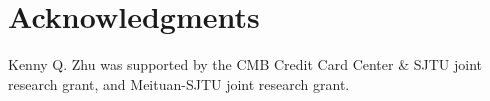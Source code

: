 \documentclass[11pt]{article}
\begin{document}
\section*{Acknowledgments}
Kenny Q. Zhu was supported by the CMB Credit Card Center \& SJTU
joint research grant, and Meituan-SJTU joint research grant.





\appendix
\clearpage


\end{document}
